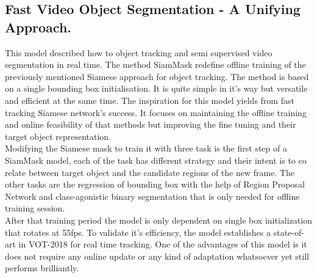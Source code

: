 \documentclass[conference]{IEEEtran}
\begin{document}
\subsection{Fast Video Object Segmentation - A Unifying Approach.}
This model described how to object tracking and semi supervised video segmentation in real time. The method SiamMask\cite{wang2019fast} redefine offline training of the previously mentioned Siamese approach for object tracking. The method is based on a single bounding box initialisation. It is quite simple in it's way but versatile and efficient at the same time. The inspiration for this model yields from fast tracking Siamese network's success. It focuses on maintaining the offline training and online feasibility of that methods but improving the fine tuning and their target object representation.\\
Modifying the Siamese mask to train it with three task is the first step of a SiamMask model, each of the task has different strategy and their intent is to co relate between target object and the candidate regions of the new frame. The other tasks are the regression of bounding box with the help of Region Proposal Network and class-agonistic binary segmentation that is only needed for offline training session. \\
After that training period the model is only dependent on single box initialization that rotates at 55fps. To validate it's efficiency, the model establishes a state-of-art in VOT-2018 for real time tracking. One of the advantages of this model is it does not require any online update or any kind of adaptation whatsoever yet still performs brilliantly.
\end{document}
